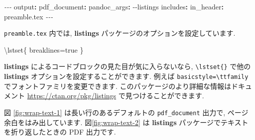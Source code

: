 \documentclass[
  11pt,
]{bxjsreport}
\newenvironment{Shaded}{\begin{snugshade}}{\end{snugshade}}
\newcommand{\AttributeTok}[1]{\textcolor[rgb]{0.77,0.63,0.00}{#1}}
\newcommand{\FunctionTok}[1]{\textcolor[rgb]{0.00,0.00,0.00}{#1}}
\newcommand{\KeywordTok}[1]{\textcolor[rgb]{0.13,0.29,0.53}{\textbf{#1}}}
\newcommand{\NormalTok}[1]{#1}
\newcommand{\PreprocessorTok}[1]{\textcolor[rgb]{0.56,0.35,0.01}{\textit{#1}}}
\begin{document}
\begin{Shaded}
\begin{Highlighting}[]
\PreprocessorTok{{-}{-}{-}}
\FunctionTok{output}\KeywordTok{:}
\AttributeTok{  }\FunctionTok{pdf\_document}\KeywordTok{:}
\AttributeTok{    }\FunctionTok{pandoc\_args}\KeywordTok{:}\AttributeTok{ {-}{-}listings}
\AttributeTok{    }\FunctionTok{includes}\KeywordTok{:}
\AttributeTok{      }\FunctionTok{in\_header}\KeywordTok{:}\AttributeTok{ preamble.tex}
\PreprocessorTok{{-}{-}{-}}
\end{Highlighting}
\end{Shaded}

\texttt{preamble.tex} 内では, \textbf{listings} パッケージのオプションを設定しています.

\begin{Shaded}
\begin{Highlighting}[]
\FunctionTok{\textbackslash{}lstset}\NormalTok{\{}
\NormalTok{  breaklines=true}
\NormalTok{\}}
\end{Highlighting}
\end{Shaded}

\textbf{listings} によるコードブロックの見た目が気に入らないなら, \texttt{\textbackslash{}lstset\{\}} で他の \textbf{listings} オプションを設定することができます. 例えば \texttt{basicstyle=\textbackslash{}ttfamily} でフォントファミリを変更できます. このパッケージのより詳細な情報はドキュメント \url{https://ctan.org/pkg/listings} で見つけることができます.

図 \ref{fig:wrap-text-1} は長い行のあるデフォルトの \texttt{pdf\_document} 出力で, ページ余白をはみ出しています. 図\ref{fig:wrap-text-2} は \textbf{listings} パッケージでテキストを折り返したときの PDF 出力です.
\end{document}
